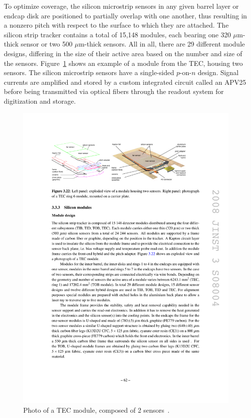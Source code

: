 To optimize coverage, the silicon microstrip sensors in any given barrel layer or endcap disk are positioned to partially overlap with one another, thus resulting in a nonzero pitch with respect to the surface to which they are attached. The silicon strip tracker contains a total of 15,148 modules, each bearing one 320 $\mu$m-thick sensor or two 500 $\mu$m-thick sensors. All in all, there are 29 different module designs, differing in the size of their active area based on the number and size of the sensors. Figure~\ref{fig:cms-tecmodule} shows an example of a module from the TEC, housing two sensors. The silicon microstrip sensors have a single-sided $p$-on-$n$ design. Signal currents are amplified and stored by a custom integrated circuit called an APV25 before being transmitted via optical fibers through the readout system for digitization and storage.

\begin{figure}[hbtp]
  \begin{center}
    \includegraphics[width=1.24\cmsFigWidth]{figures/cms-tecmodule}
    \caption{Photo of a TEC module, composed of 2 sensors~\cite{1748-0221-3-08-S08004}.}
    \label{fig:cms-tecmodule}
  \end{center}
\end{figure}

